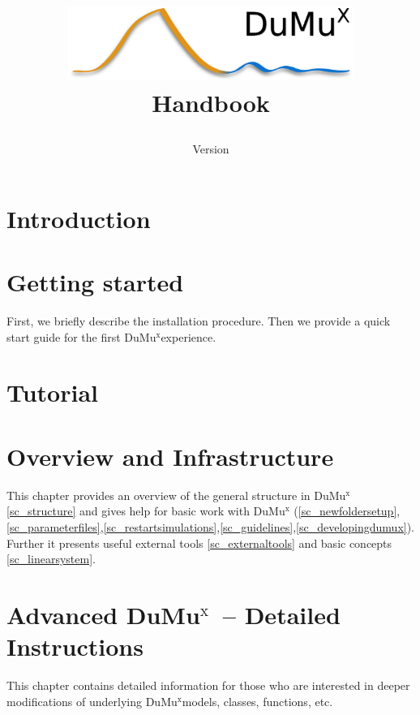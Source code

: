 \documentclass[11pt,a4paper,headinclude,footinclude,DIV16]{scrreprt}
\title{
\begin{center}
\includegraphics[width=0.7\textwidth]{../logo/dumux_logo_hires_whitebg.png}
\\[3cm]
{\Huge Handbook}
\end{center}
}
\author{}
\date{Version \DumuxVersion}
\newcommand{\Dumux}{\texorpdfstring{Du\-Mu$^\text{x}$\xspace}{DuMuX\xspace}}
\begin{document}
\maketitle

\setcounter{tocdepth}{1}
\tableofcontents
\newpage

\chapter{Introduction}


\chapter{Getting started}
First, we briefly describe the installation procedure.
Then we provide a quick start guide for the first \Dumux experience.




\chapter{Tutorial}\label{chp:tutorial}





\chapter{Overview and Infrastructure}
This chapter provides an overview of the general structure in \Dumux \ref{sc_structure}
and gives help for basic work with \Dumux
(\ref{sc_newfoldersetup},\ref{sc_parameterfiles},\ref{sc_restartsimulations},\ref{sc_guidelines},\ref{sc_developingdumux}).
Further it presents useful external tools \ref{sc_externaltools} and basic
concepts \ref{sc_linearsystem}.









\chapter{Advanced \Dumux\ -- Detailed Instructions}
This chapter contains detailed information for those who are interested
in deeper modifications of underlying \Dumux models, classes, functions, etc.









\printindex
\end{document}
